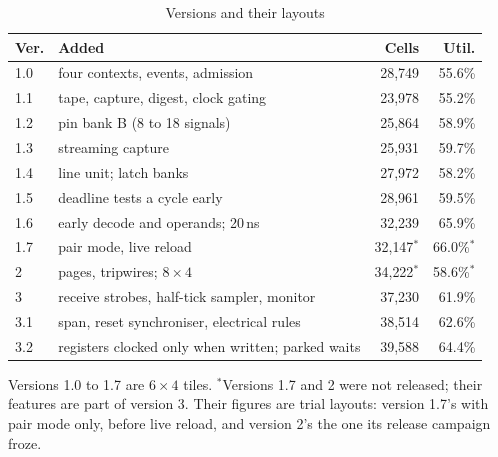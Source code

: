 \documentclass[conference,letterpaper]{IEEEtran}
\begin{document}
\begin{table}[t]
\centering
\caption{Versions and their layouts}
\label{tab:history}
\footnotesize
\begin{tabular}{@{}lp{}rr@{}}
\toprule
Ver. & Added & Cells & Util. \\
\midrule
1.0 & four contexts, events, admission & 28{,}749 & 55.6\% \\
1.1 & tape, capture, digest, clock gating & 23{,}978 & 55.2\% \\
1.2 & pin bank B (8 to 18 signals) & 25{,}864 & 58.9\% \\
1.3 & streaming capture & 25{,}931 & 59.7\% \\
1.4 & line unit; latch banks & 27{,}972 & 58.2\% \\
1.5 & deadline tests a cycle early & 28{,}961 & 59.5\% \\
1.6 & early decode and operands; 20\,ns & 32{,}239 & 65.9\% \\
1.7 & pair mode, live reload & 32{,}147$^*$ & 66.0\%$^*$ \\
2 & pages, tripwires; $8\times4$ & 34{,}222$^*$ & 58.6\%$^*$ \\
3 & receive strobes, half-tick sampler, monitor & 37{,}230 & 61.9\% \\
3.1 & span, reset synchroniser, electrical rules & 38{,}514 & 62.6\% \\
3.2 & registers clocked only when written; parked waits & 39{,}588 & 64.4\% \\
\bottomrule
\end{tabular}

\vspace{2pt}\raggedright\scriptsize Versions 1.0 to 1.7 are $6\times4$ tiles.
$^*$Versions 1.7 and 2 were not released; their features are part of version 3. Their
figures are trial layouts: version 1.7's with pair mode only, before live reload, and
version 2's the one its release campaign froze.
\end{table}
\end{document}
